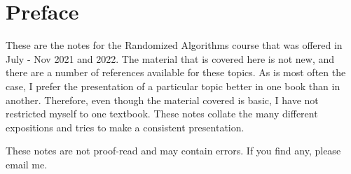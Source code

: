 \chapter*{Preface}

These are the notes for the Randomized Algorithms course that was offered in July - Nov 2021 and 2022. The material that is covered here is not new, and there
are a number of references available for these topics. As is most often the
case, I prefer the presentation of a particular topic better in one book than in
another. Therefore, even though the material covered is basic, I have not
restricted myself to one textbook. These notes collate the many different
expositions and tries to make a consistent presentation.

These notes are not proof-read and may contain errors. If you find any, please email me.